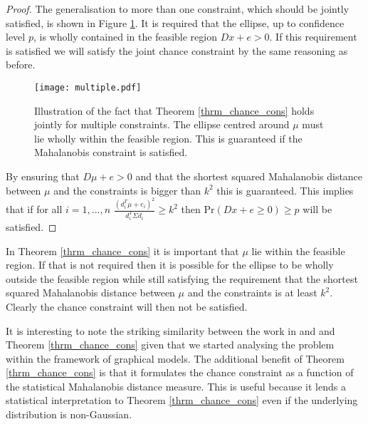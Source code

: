 \begin{proof}
The generalisation to more than one constraint, which should be jointly satisfied, is shown in Figure \ref{fig_mahala_ellipse_joint}. It is required that the ellipse, up to confidence level $p$, is wholly contained in the feasible region $Dx +e >0$. If this requirement is satisfied we will satisfy the joint chance constraint by the same reasoning as before.  
\begin{figure}[H] 
\centering
\texttt{[image: multiple.pdf]}
\caption{Illustration of the fact that Theorem \ref{thrm_chance_cons} holds jointly for multiple constraints. The ellipse centred around $\mu$ must lie wholly within the feasible region. This is guaranteed if the Mahalanobis constraint is satisfied.}
\label{fig_mahala_ellipse_joint}
\end{figure}
By ensuring that $D\mu + e > 0$ and that the shortest squared Mahalanobis distance between $\mu$ and the constraints is bigger than $k^2$ this is guaranteed. This implies that if for all $i=1,...,n$ $\frac{(d^T_i\mu+e_i)^2}{d_i^T \Sigma d_i} \geq k^2$ then $\text{Pr}(Dx + e \geq 0) \geq p$ will be satisfied.
\end{proof}
In Theorem \ref{thrm_chance_cons} it is important that $\mu$ lie within the feasible region. If that is not required then it is possible for the ellipse to be wholly outside the feasible region while still satisfying the requirement that the shortest squared Mahalanobis distance between $\mu$ and the constraints is at least $k^2$. Clearly the chance constraint will then not be satisfied. 

It is interesting to note the striking similarity between the work in \cite{vanhessem1} and \cite{vanhessem2} and Theorem \ref{thrm_chance_cons} given that we started analysing the problem within the framework of graphical models. The additional benefit of Theorem \ref{thrm_chance_cons} is that it formulates the chance constraint as a function of the statistical Mahalanobis distance measure. This is useful because it lends a statistical interpretation to Theorem \ref{thrm_chance_cons} even if the underlying distribution is non-Gaussian.

